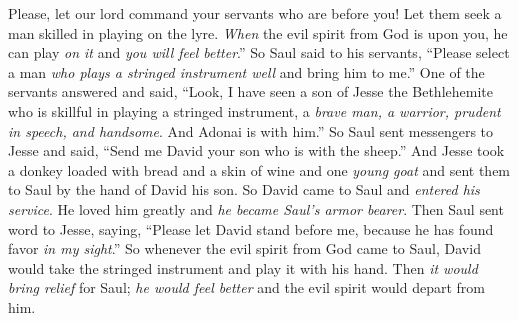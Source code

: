 \begin{biblechapter}
\verse Please, let our lord command your servants who are before you! Let them seek a man skilled in playing on the lyre. \textit{When} the evil spirit from God is upon you, he can play \textit{on it} and \textit{you will feel better}.”
\verse So Saul said to his servants, “Please select a man \textit{who plays a stringed instrument well} and bring him to me.”
\verse One of the servants answered and said, “Look, I have seen a son of Jesse the Bethlehemite who is skillful in playing a stringed instrument, a \textit{brave man, a warrior, prudent in speech, and handsome}. And Adonai is with him.”
\verse So Saul sent messengers to Jesse and said, “Send me David your son who is with the sheep.”
\verse And Jesse took a donkey loaded with bread and a skin of wine and one \textit{young goat} and sent them to Saul by the hand of David his son.
\verse So David came to Saul and \textit{entered his service}. He loved him greatly and \textit{he became Saul’s armor bearer}.
\verse Then Saul sent word to Jesse, saying, “Please let David stand before me, because he has found favor \textit{in my sight}.”
\verse So whenever the evil spirit from God came to Saul, David would take the stringed instrument and play it with his hand. Then \textit{it would bring relief} for Saul; \textit{he would feel better} and the evil spirit would depart from him.
\end{biblechapter}

